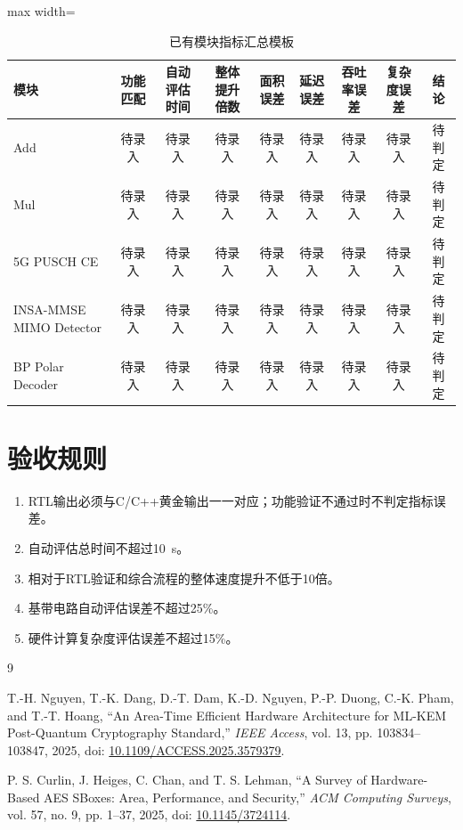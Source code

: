\documentclass[a4paper,oneside,11pt]{ctexrep}
\newcommand{\metricheader}[1]{\textbf{#1}}
\begin{document}
\begin{table}[H]
    \centering
    \scriptsize
    \begin{adjustbox}{max width=\textwidth}
    \begin{tabular}{lcccccccc}
        \toprule
        \metricheader{模块} & \metricheader{功能匹配} & \metricheader{自动评估时间} & \metricheader{整体提升倍数} & \metricheader{面积误差} & \metricheader{延迟误差} & \metricheader{吞吐率误差} & \metricheader{复杂度误差} & \metricheader{结论} \\
        \midrule
        Add & 待录入 & 待录入 & 待录入 & 待录入 & 待录入 & 待录入 & 待录入 & 待判定 \\
        Mul & 待录入 & 待录入 & 待录入 & 待录入 & 待录入 & 待录入 & 待录入 & 待判定 \\
        5G PUSCH CE & 待录入 & 待录入 & 待录入 & 待录入 & 待录入 & 待录入 & 待录入 & 待判定 \\
        INSA-MMSE MIMO Detector & 待录入 & 待录入 & 待录入 & 待录入 & 待录入 & 待录入 & 待录入 & 待判定 \\
        BP Polar Decoder & 待录入 & 待录入 & 待录入 & 待录入 & 待录入 & 待录入 & 待录入 & 待判定 \\
        \bottomrule
    \end{tabular}
    \end{adjustbox}
    \caption{已有模块指标汇总模板}
\end{table}

\section{验收规则}

\begin{enumerate}
    \item RTL输出必须与C/C++黄金输出一一对应；功能验证不通过时不判定指标误差。
    \item 自动评估总时间不超过\SI{10}{\second}。
    \item 相对于RTL验证和综合流程的整体速度提升不低于10倍。
    \item 基带电路自动评估误差不超过25\%。
    \item 硬件计算复杂度评估误差不超过15\%。
\end{enumerate}

\begin{thebibliography}{9}

T.-H. Nguyen, T.-K. Dang, D.-T. Dam, K.-D. Nguyen, P.-P. Duong,
C.-K. Pham, and T.-T. Hoang,
``An Area-Time Efficient Hardware Architecture for ML-KEM Post-Quantum
Cryptography Standard,'' \emph{IEEE Access}, vol. 13, pp. 103834--103847,
2025, doi: \href{https://doi.org/10.1109/ACCESS.2025.3579379}{10.1109/ACCESS.2025.3579379}.

P. S. Curlin, J. Heiges, C. Chan, and T. S. Lehman,
``A Survey of Hardware-Based AES SBoxes: Area, Performance, and Security,''
\emph{ACM Computing Surveys}, vol. 57, no. 9, pp. 1--37, 2025,
doi: \href{https://doi.org/10.1145/3724114}{10.1145/3724114}.

\end{thebibliography}
\end{document}
